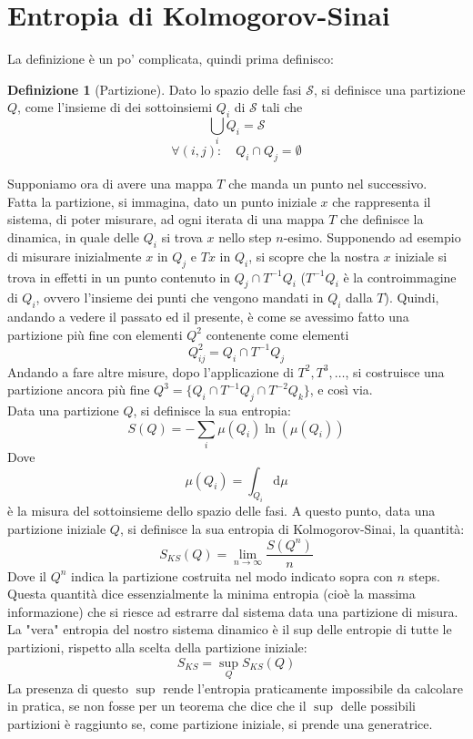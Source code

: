 \documentclass[a4paper,12pt]{article}
\theoremstyle{plain}
\theoremstyle{definition}
\newtheorem{defn}{Definizione}[section]
\newcommand{\Op}[1]{\mathcal{#1}}
\newcommand{\f}[2]{\frac{#1}{#2}}
\renewcommand{\d}{\text{d}}
\theoremstyle{remark}
\begin{document}
\section{Entropia di Kolmogorov-Sinai}
La definizione è un po' complicata, quindi prima definisco:
\begin{defn}[Partizione]
	Dato lo spazio delle fasi $\Op{S}$, si definisce una partizione $Q$, come l'insieme di dei sottoinsiemi $Q_i$ di $\Op{S}$
	tali che 
	\[\bigcup_i  Q_i=\Op{S}		\]
	\[\forall(i,j):\quad	Q_i\cap Q_j=\emptyset	\]
	
\end{defn}
Supponiamo ora di avere una mappa $T$ che manda un punto nel successivo.
\\Fatta la partizione, si immagina, dato un punto iniziale $x$ che rappresenta il sistema, di poter misurare, ad ogni iterata di una mappa $T$ che definisce la dinamica,
in quale delle $Q_i$ si trova $x$ nello step $n$-esimo.
Supponendo ad esempio di misurare inizialmente $x$ in $Q_j$ e  $Tx$ in $Q_i$, si scopre che la nostra $x$ iniziale si trova in effetti in un punto contenuto in $Q_j\cap T^{-1} Q_i$ ($T^{-1} Q_i$  è la controimmagine di $Q_i$, ovvero l'insieme dei punti che vengono mandati in $Q_i$ dalla $T$).
Quindi, andando a vedere il passato ed il presente, è come se avessimo fatto una partizione  più fine con elementi $Q^2$ contenente come elementi \[Q^2_{ij}=Q_i\cap T^{-1} Q_j\] Andando a fare altre misure,  dopo l'applicazione di $T^2,T^3,\ldots$, si costruisce una partizione ancora più fine $Q^3=\{Q_i\cap T^{-1} Q_j\cap T^{-2} Q_k\}		$, e così via.
\\Data una partizione $Q$, si definisce la sua entropia:
\[S(Q)=-\sum_i	\mu(Q_i)\ln(\mu (Q_i))	\]
Dove \[\mu(Q_i)=\int_{Q_i} \d \mu		\]
è la misura del sottoinsieme dello spazio delle fasi.
A questo punto, data una partizione iniziale $Q$, si definisce la sua entropia di Kolmogorov-Sinai, la quantità:
\[S_{KS}(Q)=\lim_{n\rightarrow\infty}	\f{S(Q^n)}{n}	\]
Dove il $Q^n$ indica la partizione costruita nel modo indicato sopra con $n$ steps.\\
Questa quantità dice essenzialmente la minima entropia (cioè la massima informazione) che si riesce ad estrarre dal sistema data una partizione di misura.\\
La "vera" entropia del nostro sistema dinamico è il sup delle entropie di tutte le partizioni, rispetto alla scelta della partizione iniziale:
\[S_{KS}=\sup_{Q} S_{KS}(Q)		\]
La presenza di questo $\sup$ rende l'entropia praticamente impossibile da calcolare in pratica, se non fosse per un teorema che dice che il $\sup$ delle possibili partizioni è raggiunto se, come partizione iniziale, si prende una generatrice.
\end{document}
